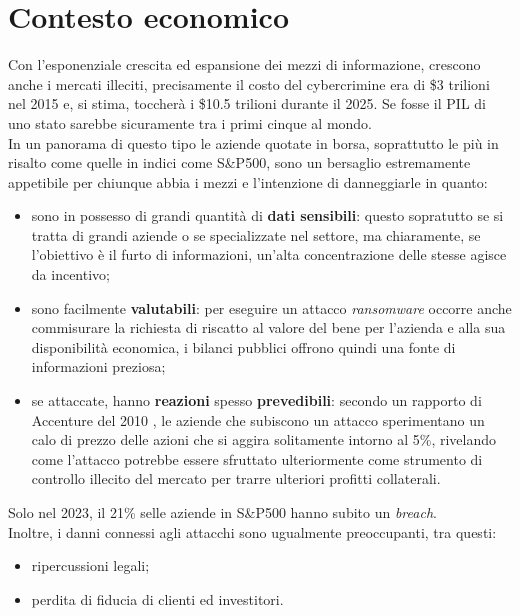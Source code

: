 \documentclass[12pt,a4paper,openright,twoside]{report}
\begin{document}
\section{Contesto economico}
Con l'esponenziale crescita ed espansione dei mezzi di informazione, crescono anche i mercati illeciti, precisamente il costo del cybercrimine era di \$3 trilioni nel 2015 e, si stima, toccher\`a i \$10.5 trilioni durante il 2025\cite{cybercrime_magazine}. Se fosse il PIL di uno stato sarebbe sicuramente tra i primi cinque al mondo.\\
In un panorama di questo tipo le aziende quotate in borsa, soprattutto le pi\`u in risalto come quelle in indici come S\&P500, sono un bersaglio estremamente appetibile per chiunque abbia i mezzi e l'intenzione di danneggiarle in quanto:
\begin{itemize}
  \setlength{\itemsep}{0pt}
  \setlength{\parskip}{0pt}       
  \renewcommand{\labelitemi}{\textbf{--}} 
  \item sono in possesso di grandi quantit\`a di \textbf{dati sensibili}: questo sopratutto se si tratta di grandi aziende o se specializzate nel settore, ma chiaramente, se l'obiettivo \`e il furto di informazioni, un'alta concentrazione delle stesse agisce da incentivo;
  \item sono facilmente \textbf{valutabili}: per eseguire un attacco \textit{ransomware} occorre anche commisurare la richiesta di riscatto al valore del bene per l'azienda e alla sua disponibilit\`a economica, i bilanci pubblici offrono quindi una fonte di informazioni  preziosa;
  \item se attaccate, hanno \textbf{reazioni} spesso \textbf{prevedibili}: secondo un rapporto di Accenture del 2010 \cite{accenture2010}, le aziende che subiscono un attacco sperimentano un calo di prezzo delle azioni che si aggira solitamente intorno al 5\%, rivelando come l'attacco potrebbe essere sfruttato ulteriormente come strumento di controllo illecito del mercato per trarre  ulteriori profitti collaterali.
\end{itemize}
Solo nel 2023, il 21\% selle aziende in S\&P500 hanno subito un \textit{breach}\cite{SecurityScorecard_SP500}.\\
Inoltre, i danni connessi agli attacchi sono ugualmente preoccupanti, tra questi:
\begin{itemize}
  \setlength{\itemsep}{0pt}   
  \setlength{\parskip}{0pt}       
  \renewcommand{\labelitemi}{\textbf{--}}  
  \item ripercussioni legali;
  \item perdita di fiducia di clienti ed investitori.
\end{itemize}
\end{document}
